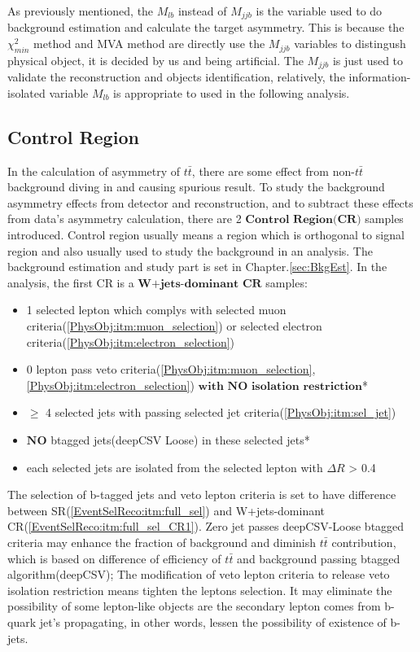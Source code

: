 		As previously mentioned, the $M_{lb}$ instead of $M_{jjb}$ is the variable used to do background estimation and calculate the target asymmetry. This is because the $\chi^2_{min}$ method and MVA method are directly use the $M_{jjb}$ variables to distingush physical object, it is decided by us and being artificial. The $M_{jjb}$ is just used to validate the reconstruction and objects identification, relatively, the information-isolated variable $M_{lb}$ is appropriate to used in the following analysis.


	\subsection{Control Region}
	\label{ssec:CR}

		In the calculation of asymmetry of $t\bar{t}$, there are some effect from non-$t\bar{t}$ background diving in and causing spurious result. To study the background asymmetry effects from detector and reconstruction, and to subtract these effects from data's asymmetry calculation, there are 2 $\textbf{Control Region(CR)}$ samples introduced. Control region usually means a region which is orthogonal to signal region and also usually used to study the background in an analysis. The background estimation and study part is set in Chapter.\ref{sec:BkgEst}. In the analysis, the first CR is a $\textbf{W+jets-dominant CR}$ samples:

		\begin{itemize}
	  		\item 1 selected lepton which complys with selected muon criteria(\ref{PhysObj:itm:muon_selection}) or selected electron criteria(\ref{PhysObj:itm:electron_selection})
	  		\item 0 lepton pass veto criteria(\ref{PhysObj:itm:muon_selection},\ref{PhysObj:itm:electron_selection}) $\textbf{with NO isolation restriction}$*
	  		\item $\geq$ 4 selected jets with passing selected jet criteria(\ref{PhysObj:itm:sel_jet})
	  		\item $\textbf{NO}$ btagged jets(deepCSV Loose) in these selected jets*
	  		\item each selected jets are isolated from the selected lepton with $\Delta R$ > 0.4
	  	\label{EventSelReco:itm:full_sel_CR1}
		\end{itemize}

		The selection of b-tagged jets and veto lepton criteria is set to have difference between SR(\ref{EventSelReco:itm:full_sel}) and W+jets-dominant CR(\ref{EventSelReco:itm:full_sel_CR1}). Zero jet passes deepCSV-Loose btagged criteria may enhance the fraction of background and diminish $t\bar{t}$ contribution, which is based on difference of efficiency of $t\bar{t}$ and background passing btagged algorithm(deepCSV); The modification of veto lepton criteria to release veto isolation restriction means tighten the leptons selection. It may eliminate the possibility of some lepton-like objects are the secondary lepton comes from b-quark jet's propagating, in other words, lessen the possibility of existence of b-jets.

